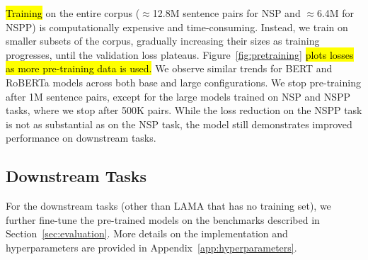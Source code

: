 \hl{Training} on the entire corpus
($\approx$12.8M sentence pairs for NSP and $\approx$6.4M for NSPP)
is computationally expensive and time-consuming. 
Instead, we train on smaller subsets of the corpus, 
gradually increasing their sizes as training progresses, 
until the validation loss plateaus.
Figure~\ref{fig:pretraining} \hl{plots losses as more pre-training data is used. }
We observe similar trends for {BERT} and {RoBERTa} models across both base and large configurations.
We stop pre-training after 1M sentence pairs, 
except for the large models trained on NSP and NSPP tasks, 
where we stop after 500K pairs. 
While the loss reduction on the NSPP task is not as substantial as on the NSP task, 
the model still demonstrates improved performance on downstream tasks.


\subsection{Downstream Tasks}
For the downstream tasks (other than LAMA that has no training set),
we further fine-tune the pre-trained models on the benchmarks described in Section~\ref{sec:evaluation}.
More details on the implementation and hyperparameters are provided in Appendix~\ref{app:hyperparameters}.
